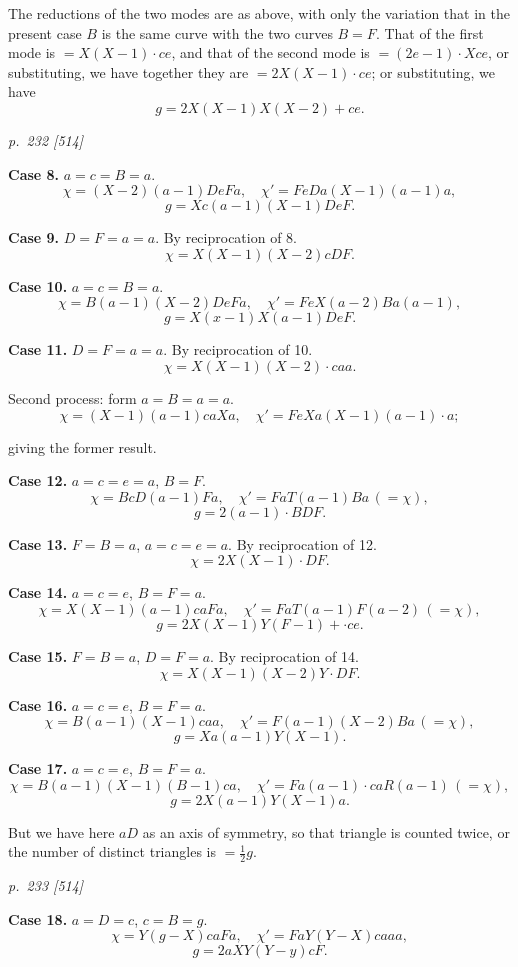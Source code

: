 \documentclass[11pt,a4paper]{book}
\begin{document}
The reductions of the two modes are as above, with only the variation that in the
present case $B$ is the same curve with the two curves $B=F$.  That of the first mode
is $=X(X-1)\cdot ce$, and that of the second mode is $=(2e-1)\cdot Xce$, or substituting, we have
together they are $=2X(X-1)\cdot ce$; or substituting, we have
\[
g=2X(X-1)X(X-2)+ce.
\]

\clearpage

\bigskip
\textit{p.~232 [514]}
\smallskip

\textbf{Case 8.}  $a=c=B=a$.
\[
\chi=(X-2)(a-1)DeFa, \quad \chi'=FeDa(X-1)(a-1)a,
\]
\[
g=Xc(a-1)(X-1)DeF.
\]

\textbf{Case 9.}  $D=F=a=a$.  By reciprocation of 8.
\[
\chi=X(X-1)(X-2)cDF.
\]

\textbf{Case 10.}  $a=c=B=a$.
\[
\chi=B(a-1)(X-2)DeFa, \quad \chi'=FeX(a-2)Ba(a-1),
\]
\[
g=X(x-1)X(a-1)DeF.
\]

\textbf{Case 11.}  $D=F=a=a$.  By reciprocation of 10.
\[
\chi=X(X-1)(X-2)\cdot caa.
\]

Second process: form $a=B=a=a$.
\[
\chi=(X-1)(a-1)caXa, \quad \chi'=FeXa(X-1)(a-1)\cdot a;
\]

giving the former result.

\textbf{Case 12.}  $a=c=e=a$, $B=F$.
\[
\chi=BcD(a-1)Fa, \quad \chi'=FaT(a-1)Ba\,(=\chi),
\]
\[
g=2(a-1)\cdot BDF.
\]

\textbf{Case 13.}  $F=B=a$, $a=c=e=a$.  By reciprocation of 12.
\[
\chi=2X(X-1)\cdot DF.
\]

\textbf{Case 14.}  $a=c=e$, $B=F=a$.
\[
\chi=X(X-1)(a-1)caFa, \quad \chi'=FaT(a-1)F(a-2)\,(=\chi),
\]
\[
g=2X(X-1)Y(F-1)+\cdot ce.
\]

\textbf{Case 15.}  $F=B=a$, $D=F=a$.  By reciprocation of 14.
\[
\chi=X(X-1)(X-2)Y\cdot DF.
\]

\textbf{Case 16.}  $a=c=e$, $B=F=a$.
\[
\chi=B(a-1)(X-1)caa, \quad \chi'=F(a-1)(X-2)Ba\,(=\chi),
\]
\[
g=Xa(a-1)Y(X-1).
\]

\textbf{Case 17.}  $a=c=e$, $B=F=a$.
\[
\chi=B(a-1)(X-1)(B-1)ca, \quad \chi'=Fa(a-1)\cdot caR(a-1)\,(=\chi),
\]
\[
g=2X(a-1)Y(X-1)a.
\]

But we have here $aD$ as an axis of symmetry, so that triangle is counted
twice, or the number of distinct triangles is $=\frac{1}{2}g$.

\clearpage

\bigskip
\textit{p.~233 [514]}
\smallskip

\textbf{Case 18.}  $a=D=c$, $c=B=g$.
\[
\chi=Y(g-X)caFa, \quad \chi'=FaY(Y-X)caaa,
\]
\[
g=2aXY(Y-y)cF.
\]
\end{document}
